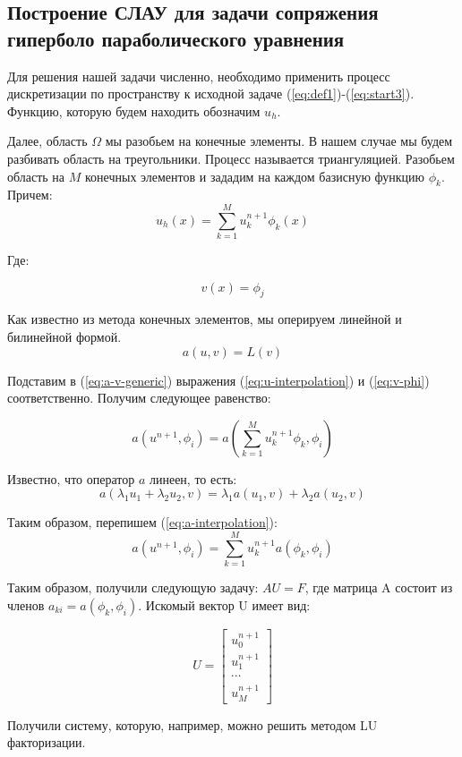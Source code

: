 \subsection{Построение СЛАУ для задачи сопряжения гиперболо параболического уравнения}

Для решения нашей задачи численно, необходимо применить процесс дискретизации по пространству 
к исходной задаче (\ref{eq:def1})-(\ref{eq:start3}). Функцию, которую будем находить обозначим $u_h$.

Далее, область $\Omega$ мы разобьем на конечные элементы. 
В нашем случае мы будем разбивать область на треугольники. Процесс называется триангуляцией.
Разобьем область на $M$ конечных элементов и зададим на каждом базисную функцию $\phi_k$. Причем:
\begin{equation}
    u_h(x) = \sum_{k=1}^Mu_k^{n+1}\phi_k(x)
    \label{eq:u-interpolation}
\end{equation}

Где:

\begin{equation}
    v(x) = \phi_j
    \label{eq:v-phi}
\end{equation}

Как известно из метода конечных элементов, мы оперируем линейной и билинейной формой. 
\begin{equation}
    a(u, v) = L(v)
    \label{eq:a-v-generic}
\end{equation}

Подставим в (\ref{eq:a-v-generic}) выражения (\ref{eq:u-interpolation}) и (\ref{eq:v-phi}) соответственно. Получим следующее равенство:

\begin{equation}
    a(u^{n+1}, \phi_i) = a(\sum_{k=1}^{M}u_k^{n+1}\phi_k, \phi_i)
    \label{eq:a-interpolation}
\end{equation}

Известно, что оператор $a$ линеен, то есть:
$$ a(\lambda_1u_1 + \lambda_2u_2, v) = \lambda_1a(u_1, v) + \lambda_2a(u_2, v) $$

Таким образом, перепишем (\ref{eq:a-interpolation}):
\begin{equation}
    a(u^{n+1}, \phi_i) = \sum_{k=1}^{M}u_k^{n+1}a(\phi_k, \phi_i)
    \label{a-slau1}
\end{equation}

Таким образом, получили следующую задачу: $AU=F$, где матрица A состоит из членов $a_{ki} = a(\phi_k, \phi_i)$.
Искомый вектор U имеет вид:

$$ U = \begin{bmatrix} u_0^{n+1} \\ u_1^{n+1} \\ \cdots \\ u_M^{n+1} \end{bmatrix} $$

Получили систему, которую, например, можно решить методом LU факторизации.
